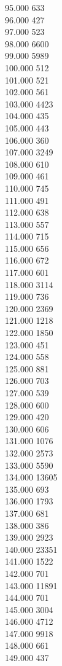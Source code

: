 { 95.000	633 \\
 96.000	427 \\
 97.000	523 \\
 98.000	6600 \\
 99.000	5989 \\
 100.000	512 \\
 101.000	521 \\
 102.000	561 \\
 103.000	4423 \\
 104.000	435 \\
 105.000	443 \\
 106.000	360 \\
 107.000	3249 \\
 108.000	610 \\
 109.000	461 \\
 110.000	745 \\
 111.000	491 \\
 112.000	638 \\
 113.000	557 \\
 114.000	715 \\
 115.000	656 \\
 116.000	672 \\
 117.000	601 \\
 118.000	3114 \\
 119.000	736 \\
 120.000	2369 \\
 121.000	1218 \\
 122.000	1850 \\
 123.000	451 \\
 124.000	558 \\
 125.000	881 \\
 126.000	703 \\
 127.000	539 \\
 128.000	600 \\
 129.000	420 \\
 130.000	606 \\
 131.000	1076 \\
 132.000	2573 \\
 133.000	5590 \\
 134.000	13605 \\
 135.000	693 \\
 136.000	1793 \\
 137.000	681 \\
 138.000	386 \\
 139.000	2923 \\
 140.000	23351 \\
 141.000	1522 \\
 142.000	701 \\
 143.000	11891 \\
 144.000	701 \\
 145.000	3004 \\
 146.000	4712 \\
 147.000	9918 \\
 148.000	661 \\
 149.000	437 \\
}
